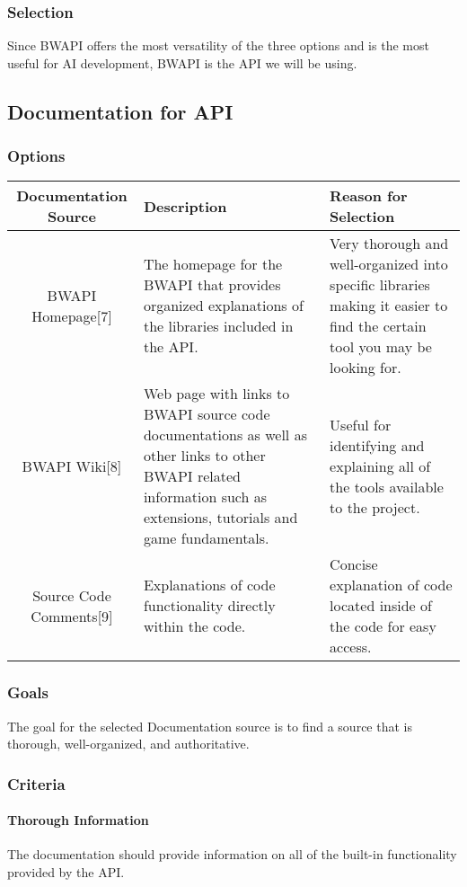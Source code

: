 \documentclass[10pt,letterpaper,onecolumn,draftclsnofoot]{IEEEtran}
\begin{document}
\subsubsection{Selection}
	Since BWAPI offers the most versatility of the three options and is the most useful for AI development, BWAPI is the API we will be using. 
\subsection{Documentation for API}
\subsubsection{Options}
\begin{center}
	\begin{tabular}{ ||C|L|L|| } 
		\hline
		Documentation Source & Description & Reason for Selection \\
		\hline
		BWAPI Homepage[7]  & The homepage for the BWAPI that provides organized explanations of the libraries included in the API. & Very thorough and well-organized into specific libraries making it easier to find the certain tool you may be looking for. \\ 
		\hline
		BWAPI Wiki[8] & Web page with links to BWAPI source code documentations as well as other links to other BWAPI related information such as extensions, tutorials and game fundamentals. & Useful for identifying and explaining all of the tools available to the project. \\ 
		\hline
		Source Code Comments[9] & Explanations of code functionality directly within the code. & Concise explanation of code located inside of the code for easy access. \\
		\hline
	\end{tabular}
\end{center}
\subsubsection{Goals}
The goal for the selected Documentation source is to find a source that is thorough, well-organized, and authoritative.
\subsubsection{Criteria}
	\paragraph{Thorough Information}
	The documentation should provide information on all of the built-in functionality provided by the API.
\end{document}
